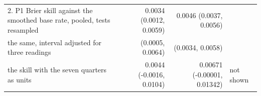 \begin{tabular}{p{5.6cm}rrp{2.4cm}}
\midrule
2. P1 Brier skill against the smoothed base rate, pooled, tests resampled & 0.0034 (0.0012, 0.0059) & 0.0046 (0.0037, 0.0056) &  \\
\quad the same, interval adjusted for three readings & (0.0005, 0.0064) & (0.0034, 0.0058) &  \\
\quad the skill with the seven quarters as units & 0.0044 (-0.0016, 0.0104) & 0.00671 (-0.00001, 0.01342) & not shown \\

\end{tabular}
